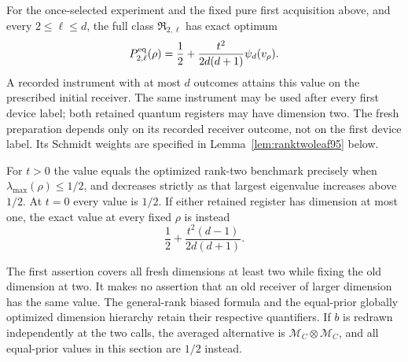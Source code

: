 \begin{theorem}
\label{thm:equalinitial95}
For the once-selected experiment and the fixed pure first acquisition
above, and every $2\le\ell\le d$, the full class
$\mathfrak R_{2,\ell}$ has exact optimum
\begin{equation}\label{eq:equalinitial95}
 P_{2,\ell}^{\rm eq}(\rho)
   =\frac12+\frac{t^2}{2d(d+1)}\psi_d(v_\rho).
\end{equation}
A recorded instrument with at most $d$ outcomes attains this value on
the prescribed initial receiver.  The same instrument may be used after
every first device label; both retained quantum registers may have
dimension two.  The fresh preparation depends only on its recorded
receiver outcome, not on the first device label.  Its Schmidt weights
are specified in Lemma~\ref{lem:ranktwoleaf95} below.

For $t>0$ the value equals the optimized rank-two benchmark precisely
when $\lambda_{\max}(\rho)\le1/2$, and decreases strictly as that
largest eigenvalue increases above $1/2$.  At $t=0$ every value is
$1/2$.  If either retained register has dimension at most one, the
exact value at every fixed $\rho$ is instead
\begin{equation}\label{eq:rankoneinitial95}
 \frac12+\frac{t^2(d-1)}{2d(d+1)}.
\end{equation}
\end{theorem}
The first assertion covers all fresh dimensions at least two while
fixing the old dimension at two.  It makes no assertion that an old
receiver of larger dimension has the same value.  The general-rank
biased formula and the equal-prior globally optimized dimension
hierarchy retain their respective quantifiers.  If $b$ is redrawn
independently at the two calls, the averaged alternative is
$\mathcal M_C\otimes\mathcal M_C$, and all equal-prior values in
this section are $1/2$ instead.


